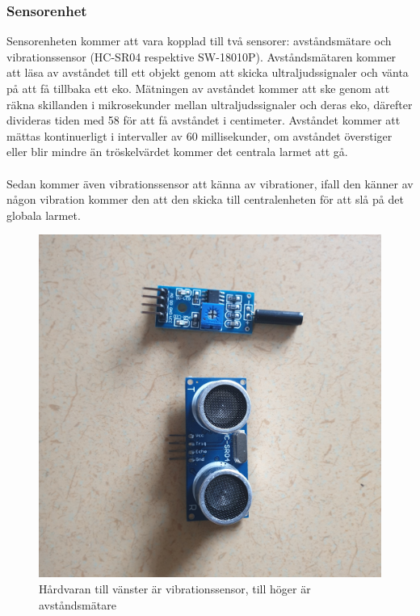 \documentclass{article}
\begin{document}
\subsubsection{Sensorenhet}

Sensorenheten kommer att vara kopplad till två sensorer: avståndsmätare och vibrationssensor (HC-SR04 respektive SW-18010P).
Avståndsmätaren kommer att läsa av avståndet till ett objekt genom att skicka ultraljudssignaler och vänta på att få tillbaka ett eko. 
Mätningen av avståndet kommer att ske genom att räkna skillanden i mikrosekunder mellan ultraljudssignaler och deras eko, därefter divideras tiden med 58 för att få avståndet i centimeter. 
Avståndet kommer att mättas kontinuerligt i intervaller av 60 millisekunder, om avståndet överstiger eller blir mindre än tröskelvärdet kommer det centrala larmet att gå.\\
\\
Sedan kommer även vibrationssensor att känna av vibrationer, ifall den känner av någon vibration kommer den att den skicka till centralenheten för att slå på det globala larmet.

\begin{figure}[h]
    \centering
    \includegraphics[scale=0.05]{Projektrapport/sensor.png}
    \caption {Hårdvaran till vänster är vibrationssensor, till höger är avståndsmätare}
    \label{fig:drawing}
\end{figure}
\end{document}
